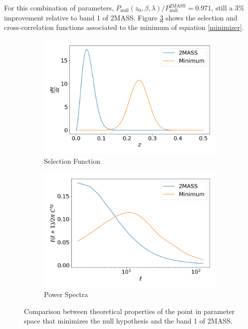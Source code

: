 \documentclass[openany,a4paper,12pt,oneside]{book}
\begin{document}
\begin{spacing}{1.5}
For this combination of parameters, $P_\text{null}(z_0, \beta,\lambda)/P_\text{null}^\text{2MASS}=0.971$, still a 3\% improvement relative to band 1 of 2MASS. Figure \ref{fig:minimum_properties} shows the selection and cross-correlation functions associated to the minimum of equation \eqref{minimizer}.

\begin{figure}[!htb]
     \centering
     \begin{subfigure}[b]{0.49\textwidth}
         \centering
         \includegraphics[width=\textwidth]{Imagens/minimum_SelFunc.png}
         \caption{Selection Function}         
         \label{subfig:minimum_SelFunc}
     \end{subfigure}
     \hfill
     \begin{subfigure}[b]{0.49\textwidth}
         \centering
         \includegraphics[width=\textwidth]{Imagens/minimumX2mass.png}
         \caption{Power Spectra}
         \label{subfig:minimum_PowSpec}
     \end{subfigure}
        \caption{Comparison between theoretical properties of the point in parameter space that minimizes the null hypothesis and the band 1 of 2MASS.}
        \label{fig:minimum_properties}
\end{figure}


\end{spacing}
\end{document}
